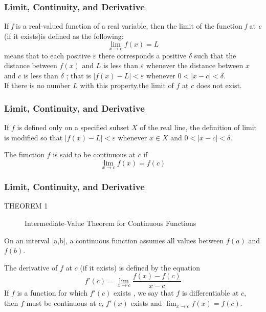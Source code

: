 \documentclass[notheorems,mathserif,table,compress]{beamer}  %
\begin{document}
\begin{frame}
  \frametitle{Limit, Continuity, and Derivative}
  If \emph{f} is a real-valued function of a real variable, then the limit of the function \emph{f} at \emph{c} (if it exists)is defined as the following:
\begin{displaymath}
\lim_{x \to c}f(x)=L
\end{displaymath}
means that to each positive $\varepsilon$ there corresponds a positive $\delta$ such that the distance between $f(x)$ and $L$ is less than $\varepsilon$ whenever the distance between $x$ and $c$ is less than $\delta$ ; that is $|f(x)−L|<\varepsilon$ whenever $0<|x−c|<\delta$.
\\If there is no number $L$ with this property,the limit of $f$ at $c$ does not exist.
\end{frame}

\begin{frame}
  \frametitle{Limit, Continuity, and Derivative}
 If $f$ is defined only on a specified subset $X$ of
the real line, the definition of limit is modified
so that $|f(x)−L| < \varepsilon$ whenever $x \in X$ and $0<|x−c|<\delta$.
\newline

The function $f$ is said to be continuous at $c$ if
\begin{displaymath}
\lim_{x \to c}f(x)=f(c)
\end{displaymath}
\end{frame}

\begin{frame}
  \frametitle{Limit, Continuity, and Derivative}
\begin{description}
\item[THEOREM 1] \textsf{Intermediate-Value Theorem for Continuous Functions}
\end{description}
On an interval [a,b], a continuous function assumes all values between $f(a)$ and $f(b)$. 
\newline

The derivative of $f$ at $c$ (if it exists)
is defined by the equation
\begin{displaymath}
f '(c)=\lim_{x \to c}\frac{f(x)-f(c)}{x-c}
\end{displaymath}
If $f$ is a function for which $f '(c)$ exists , we say that $f$ is differentiable at $c$, then $f$ must be
continuous at $c$, $f '(x)$ exists and 
$\lim_{x \to c}f(x)=f(c)$.
\end{frame}
\end{document}
